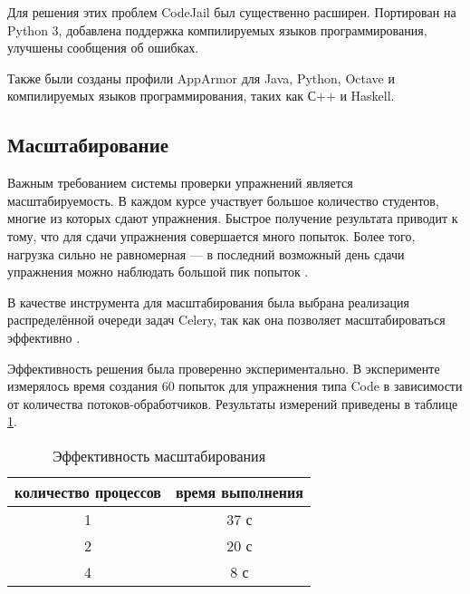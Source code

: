 \documentclass{matmex-diploma-custom}
\begin{document}
Для решения этих проблем CodeJail был существенно
расширен. Портирован на Python 3, добавлена поддержка компилируемых
языков программирования, улучшены сообщения об ошибках.

Также были созданы профили AppArmor для Java, Python, Octave и
компилируемых языков программирования, таких как С++ и Haskell.

\subsection{Масштабирование}
Важным требованием системы проверки упражнений является
масштабируемость. В каждом курсе участвует большое количество
студентов, многие из которых сдают упражнения. Быстрое получение
результата приводит к тому, что для сдачи упражнения совершается много
попыток. Более того, нагрузка сильно не равномерная --- в последний
возможный день сдачи упражнения можно наблюдать большой пик
попыток \cite{breslow2013studying}.

В качестве инструмента для масштабирования была выбрана реализация
распределённой очереди задач Celery, так как она позволяет
масштабироваться эффективно \cite{celery}.

Эффективность решения была проверенно экспериментально. В эксперименте
измерялось время создания 60 попыток для упражнения типа Code в
зависимости от количества потоков-обработчиков. Результаты измерений
приведены в таблице \ref{table:scal}.

\begin{table}[h]
  \centering
\begin{tabular}{|c|c|}
\hline
количество процессов & время выполнения \\
\hline
1 & 37 с \\
2 & 20 с \\
4 & 8 с \\
\hline
\end{tabular}
  \caption{Эффективность масштабирования}
  \label{table:scal}
\end{table}

\iffalse
#+ORGTBL: SEND scal orgtbl-to-latex :splice nil :skip 0
|----------------------+------------------|
| количество процессов | время выполнения |
|----------------------+------------------|
|                    1 | 37 с             |
|                    2 | 20 с             |
|                    4 | 8 с              |
|----------------------+------------------|
\fi
\end{document}
